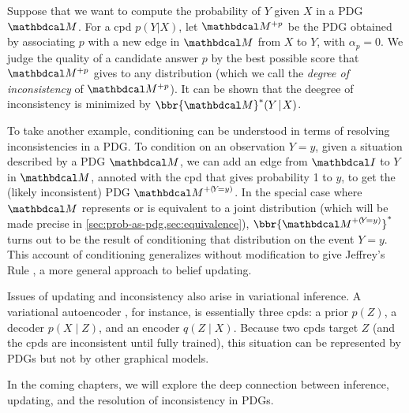 Suppose that we want to compute the probability of $Y$ given $X$ in a PDG $\dg
M$. For a cpd $p(Y|X)$, let $\dg M^{+p}$ be the PDG obtained by associating $p$
with a new edge in $\dg M$ from $X$ to $Y$, with $\alpha_p \!=\! 0$. We judge
the quality of a candidate answer $p$ by the best possible score that $\dg
M^{+p}$ gives to any distribution (which we call the \emph{degree of
inconsistency} of $\dg M^{+p}$). It can be shown that the deegree of
inconsistency is minimized by $\bbr{\dg M}^*(Y\!\mid\! X)$. 

To take another example,
conditioning can be understood in terms of resolving inconsistencies
in a PDG.  To condition on an observation $Y\!=\!y$, given a situation
described by a PDG $\dg M$, we can add an edge 
from $\pdgunit$ to $Y$ in $\dg M$, annoted with the cpd that gives
probability 1 to $y$, to get the (likely inconsistent) PDG
${\dg M}^{+(\!Y\!=y)}$.   
In the special case where $\dg M$ represents or is equivalent to a joint distribution
    (which will be made precise in \cref{sec:prob-as-pdg,sec:equivalence}), 
    $\bbr{{\dg M}^{+(\!Y\!=y)}}^*$ turns out
    to be the result of conditioning that distribution on the event $Y{=}y$. 
This account of conditioning generalizes
without modification to give Jeffrey's Rule \cite{Jeffrey68}, a more
general approach to belief updating. 

Issues of updating and inconsistency also arise in variational inference. A  
variational autoencoder \cite{kingma2013autoencoding}, for instance, 
is essentially three cpds: a prior $p(Z)$, a decoder $p(X \!\mid\! Z)$, and 
an encoder $q(Z \!\mid\! X)$. Because two cpds target $Z$ (and the cpds are 
inconsistent until fully trained), this situation
can be represented by PDGs but not
by other graphical models.

In the coming chapters, we will explore 
the deep connection between inference, updating, 
and the resolution of inconsistency in PDGs.
	
